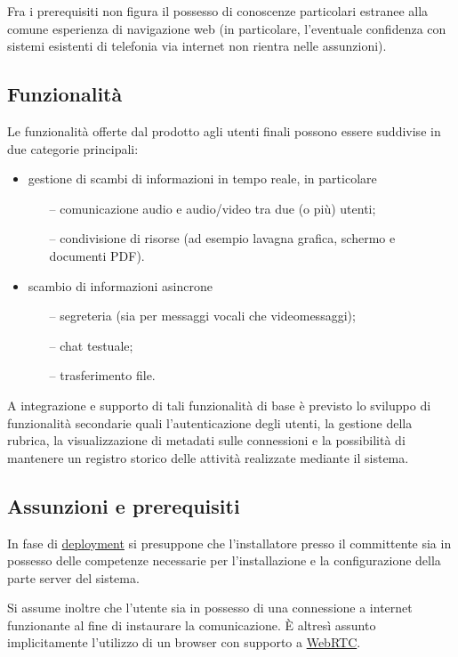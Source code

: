 Fra i prerequisiti non figura il possesso di conoscenze particolari estranee alla comune esperienza di navigazione web (in particolare, l'eventuale confidenza con sistemi esistenti di telefonia via internet non rientra nelle assunzioni).

\subsection{Funzionalità}
Le funzionalità offerte dal prodotto agli utenti finali possono essere suddivise in due categorie principali:
\begin{itemize}
  \item gestione di scambi di informazioni in tempo reale, in particolare
  \begin{itemize}
  \item[--] comunicazione audio e audio/video tra due (o più) utenti;
  \item[--] condivisione di risorse (ad esempio lavagna grafica, schermo e documenti PDF). 
  \end{itemize}
  \item scambio di informazioni asincrone 
  \begin{itemize}
  \item[--] segreteria (sia per messaggi vocali che videomessaggi);
  \item[--] chat testuale;
  \item[--] trasferimento file.
  \end{itemize}
\end{itemize}

A integrazione e supporto di tali funzionalità di base è previsto lo sviluppo di funzionalità secondarie quali l'autenticazione degli utenti, la gestione della rubrica, la visualizzazione di metadati sulle connessioni e la possibilità di mantenere un registro storico delle attività realizzate mediante il sistema.

\subsection{Assunzioni e prerequisiti}
In fase di \underline{deployment} si presuppone che l'installatore presso il committente sia in possesso delle competenze necessarie per l'installazione e la configurazione della parte server del sistema.

Si assume inoltre che l'utente sia in possesso di una connessione a internet funzionante al fine di instaurare la comunicazione. È altresì assunto implicitamente l'utilizzo di un browser con supporto a \underline{WebRTC}.

\clearpage



